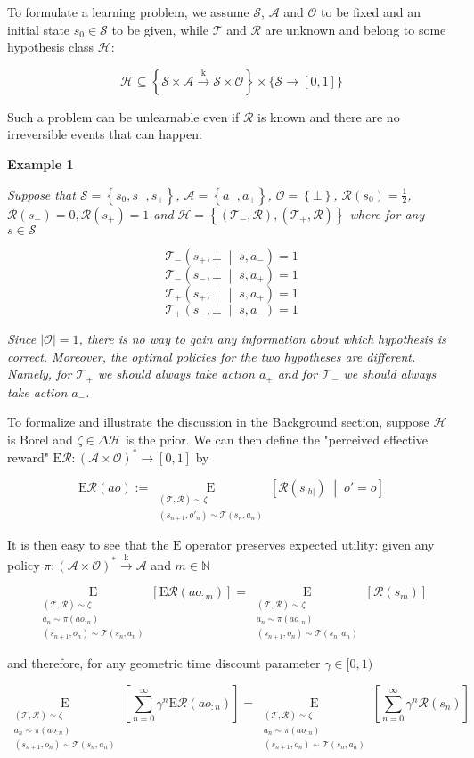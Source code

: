 \documentclass[a4paper]{article}
\newcommand{\Co}[1]{}
\newcommand{\AP}[1]{\left(#1\right)}
\newcommand{\AB}[1]{\left[#1\right]}
\newcommand{\AC}[1]{\left\{#1\right\}}
\newcommand{\APM}[2]{\left(#1\;\middle\vert\;#2\right)}
\newcommand{\ABM}[2]{\left[#1\;\middle\vert\;#2\right]}
\newcommand{\Abs}[1]{\left\vert #1 \right\vert}
\newcommand{\Ea}[2]{\underset{#1}{\operatorname{E}}\AB{#2}}
\newcommand{\CE}[3]{\underset{#1}{\operatorname{E}}\ABM{#2}{#3}}
\newcommand{\Nats}{\mathbb{N}}
\newcommand{\K}{\xrightarrow{\mathrm{k}}}
\newcommand{\St}{\mathcal{S}}
\newcommand{\A}{\mathcal{A}}
\newcommand{\Ob}{\mathcal{O}}
\newcommand{\AO}{\AP{\A\times\Ob}}
\newcommand{\FH}{\AO^*}
\newcommand{\R}{\mathcal{R}}
\newcommand{\T}{\mathcal{T}}
\newcommand{\Hy}{\mathcal{H}}
\newcommand{\ER}{\mathrm{E}}
\begin{document}
To formulate a learning problem, we assume $\St$, $\A$ and $\Ob$ to be fixed and an initial state $s_0\in\St$ to be given, while $\T$ and $\R$ are unknown and belong to some hypothesis class $\Hy$:

$$\Hy\subseteq\AC{\St\times\A\K\St\times\Ob}\times\bigg\{\St\rightarrow[0,1]\bigg\}$$

Such a problem can be unlearnable even if $\R$ is known and there are no irreversible events that can happen:

\textbf{Example 1}\Co{b}

\textit{Suppose that $\St=\AC{s_0,s_-,s_+}$, $\A=\AC{a_-,a_+}$, $\Ob=\AC{\bot}$, $\R\AP{s_0}=\frac{1}{2}$, $\R\AP{s_-}=0, \R\AP{s_+}=1$ and $\Hy=\AC{\AP{\T_-,\R},\AP{\T_+,\R}}$ where for any $s\in\St$}\Co{i}

$$\T_-\APM{s_+,\bot}{s,a_-}=1$$
$$\T_-\APM{s_-,\bot}{s,a_+}=1$$ 
$$\T_+\APM{s_+,\bot}{s,a_+}=1$$
$$\T_+\APM{s_-,\bot}{s,a_-}=1$$ 

\textit{Since $\Abs{\Ob}=1$, there is no way to gain any information about which hypothesis is correct. Moreover, the optimal policies for the two hypotheses are different. Namely, for $\T_+$ we should always take action $a_+$ and for $\T_-$ we should always take action $a_-$.}\Co{i}

To formalize and illustrate the discussion in the Background section, suppose $\Hy$ is Borel and $\zeta\in\Delta\Hy$ is the prior. We can then define the "perceived effective reward" $\ER\R:\FH\rightarrow[0,1]$ by

$$\ER\R(ao):=\CE{\substack{(\T,\R)\sim\zeta\\\AP{s_{n+1},o'_n}\sim\T\AP{s_n,a_n}}}{\R\AP{s_{\Abs{h}}}}{o'=o}$$

It is then easy to see that the $\ER$ operator preserves expected utility: given any policy $\pi:\FH\K \A$ and $m\in\Nats$

$$\Ea{\substack{(\T,\R)\sim\zeta\\a_n\sim\pi\AP{ao_{:n}}\\\AP{s_{n+1},o_n}\sim\T\AP{s_n,a_n}}}{\ER\R\AP{ao_{:m}}}=\Ea{\substack{(\T,\R)\sim\zeta\\a_n\sim\pi\AP{ao_{:n}}\\\AP{s_{n+1},o_n}\sim\T\AP{s_n,a_n}}}{\R\AP{s_m}}$$

and therefore, for any geometric time discount parameter $\gamma\in[0,1)$

$$\Ea{\substack{(\T,\R)\sim\zeta\\a_n\sim\pi\AP{ao_{:n}}\\\AP{s_{n+1},o_n}\sim\T\AP{s_n,a_n}}}{\sum_{n=0}^\infty\gamma^n\ER\R\AP{ao_{:n}}}=\Ea{\substack{(\T,\R)\sim\zeta\\a_n\sim\pi\AP{ao_{:n}}\\\AP{s_{n+1},o_n}\sim\T\AP{s_n,a_n}}}{\sum_{n=0}^\infty\gamma^n\R\AP{s_n}}$$
\end{document}
